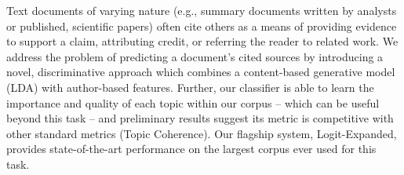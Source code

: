 Text documents of varying nature (e.g., summary documents written by analysts or published, scientific papers) often cite others as a means of providing evidence to support a claim, attributing credit, or referring the reader to related work. We address the problem of predicting a document's cited sources by introducing a novel, discriminative approach which combines a content-based generative model (LDA) with author-based features. Further, our classifier is able to learn the importance and quality of each topic within our corpus -- which can be useful beyond this task -- and preliminary results suggest its metric is competitive with other standard metrics (Topic Coherence). Our flagship system, Logit-Expanded, provides state-of-the-art performance on the largest corpus ever used for this task.

